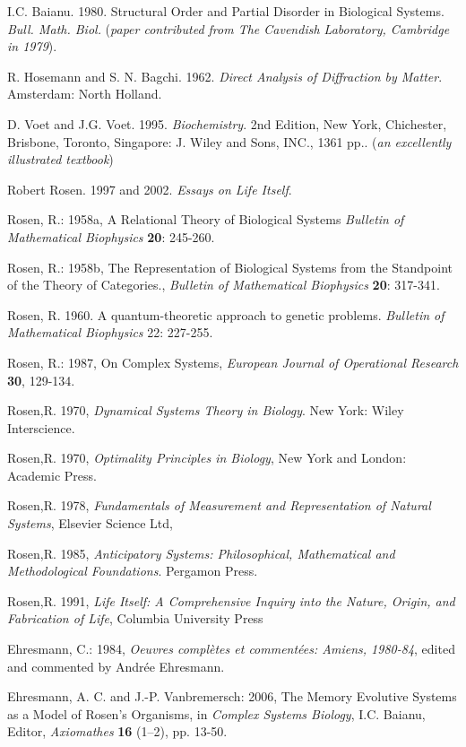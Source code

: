 \documentclass[12pt]{article}
\theoremstyle{plain}
\theoremstyle{definition}
\numberwithin{equation}{section}
\begin{document}
\begin{thebibliography}{9}
I.C. Baianu. 1980. Structural Order and Partial Disorder in Biological Systems. \emph{Bull. Math. Biol.}
(\emph{paper contributed from The Cavendish Laboratory, Cambridge in 1979}). 

R. Hosemann and S. N. Bagchi. 1962. \emph{Direct Analysis of Diffraction by Matter}. Amsterdam: North Holland.

D. Voet and J.G. Voet. 1995. \emph{Biochemistry}. 2nd Edition, New York, Chichester, Brisbone, Toronto,
Singapore: J. Wiley and Sons, INC., 1361 pp.. (\emph{an excellently illustrated textbook})

Robert Rosen. 1997 and 2002. \emph{Essays on Life Itself}. 

Rosen, R.: 1958a, A Relational Theory of Biological Systems 
\emph{Bulletin of Mathematical Biophysics} \textbf{20}: 245-260.

Rosen, R.: 1958b, The Representation of Biological Systems from the Standpoint of the Theory of Categories., 
\emph{Bulletin of Mathematical Biophysics} \textbf{20}: 317-341.

Rosen, R. 1960. A quantum-theoretic approach to genetic problems. \emph{Bulletin of Mathematical Biophysics} 
22: 227-255.

Rosen, R.: 1987, On Complex Systems, \emph{European Journal of Operational Research} 
\textbf{30}, 129-134.

Rosen,R. 1970, \emph{Dynamical Systems Theory in Biology}. New York: Wiley Interscience. 

Rosen,R. 1970, \emph{Optimality Principles in Biology}, New York and London: Academic Press. 

Rosen,R. 1978, \emph{Fundamentals of Measurement and Representation of Natural Systems}, Elsevier Science Ltd, 

Rosen,R. 1985, \emph{Anticipatory Systems: Philosophical, Mathematical and Methodological Foundations}. Pergamon Press. 

Rosen,R. 1991, \emph{Life Itself: A Comprehensive Inquiry into the Nature, Origin, and Fabrication of Life}, Columbia University Press 

Ehresmann, C.: 1984, \emph{Oeuvres compl\`etes et  comment\'ees: Amiens, 1980-84}, edited and commented 
by Andr\'ee Ehresmann.

Ehresmann, A. C. and J.-P. Vanbremersch: 2006, The Memory Evolutive Systems as a Model of Rosen's Organisms, 
in \emph{Complex Systems Biology}, I.C. Baianu, Editor, \emph{Axiomathes} \textbf{16} (1--2), pp. 13-50.


\end{thebibliography}
\end{document}
